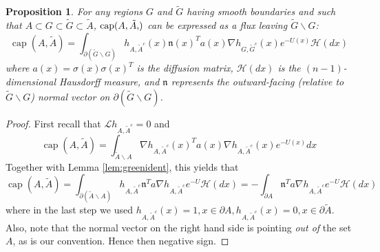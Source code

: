 \documentclass[12pt, nofootinbib,english, amsmath, amssymb, aps, priprint, graphicx,floatfix]{revtex4-1}
\newcommand{\tmop}[1]{\ensuremath{\operatorname{#1}}}
\newtheorem{proposition}{Proposition}
\theoremstyle{plain}
\theoremstyle{definition}
\theoremstyle{plain}
\newcommand{\normal}{{\mathfrak{n}}}
\newcommand{\capac}[2]{\ensuremath{\operatorname{cap}}(#1,#2)}
\newcommand{\hausdorffmeasure}{\mathscr{H}(dx)}
\newcommand{\tA}{{\tilde A}}
\begin{document}
\def\theproposition{\ref{prop:flux}}
\begin{proposition}
For any regions $G$ and $\tilde{G}$ having smooth boundaries and such that $A\subset G \subset \tilde G \subset \tilde A$, $\capac{A,\tA}$ can be expressed as a flux leaving $\tilde G \backslash G$:
\[
\ensuremath{\operatorname{cap}} (A, \tilde{A}) = \int_{\partial (\tilde G \backslash G)}  h_{A, \tilde{A}^c} (x)   \normal(x)^T a (x) \nabla h_{G, \tilde{G}^c} (x)e^{- U (x)} \hausdorffmeasure
\]
where $a(x)=\sigma(x)\sigma(x)^T$ is the diffusion matrix, $\hausdorffmeasure$ is the $(n-1)$-dimensional Hausdorff measure, and $\normal$ represents the outward-facing (relative to $\tilde G \backslash G$) normal vector on $\partial (\tilde G \backslash G)$.
\end{proposition}
\addtocounter{proposition}{-1}
\begin{proof}
First recall that $\mathcal{L} h_{A, \tilde{A}^c} = 0$ and
\begin{equation*}
	\tmop{cap}(A,\tilde A) = \int_{\tilde A \backslash A} \nabla h_{A, \tilde{A}^c} (x)^T a(x) \nabla h_{A, \tilde{A}^c} (x) e^{-U(x)} dx
\end{equation*}
Together with Lemma \ref{lem:greenident}, this yields that
\begin{equation}\label{eq:lemmaproof}
\tmop{cap}(A,\tilde A)  = \int_{\partial (\tilde A \backslash A)}  h_{A, \tilde{A}^c} \normal^T a  \nabla h_{A, \tilde{A}^c} e^{- U } \hausdorffmeasure = -\int_{\partial A}  \normal^T a  \nabla h_{A, \tilde{A}^c} e^{- U } \hausdorffmeasure
\end{equation}
where in the last step we used $h_{A,\tilde A^c}(x)=1,x\in \partial A,h_{A,\tilde A^c}(x)=0,x\in \partial \tilde A$.  Also, note that the normal vector on the right hand side is pointing {\em out of} the set $A$, as is our convention. Hence then negative sign.


\end{proof}
\end{document}
